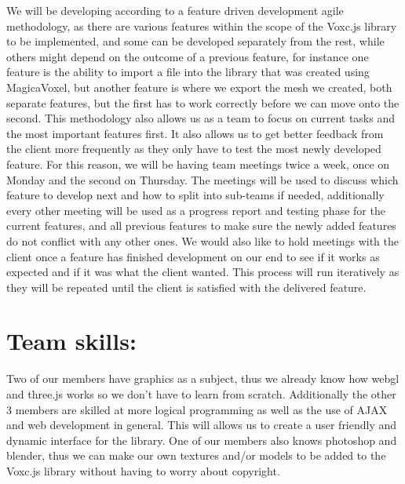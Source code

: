 \documentclass[english]{article}
\begin{document}
	We will be developing according to a feature driven development agile methodology, as there are various features within the scope of the Voxc.js library to be implemented, and some can be developed separately from the rest, while others might depend on the outcome of a previous feature, for instance one feature is the ability to import a file into the library that was created using MagicaVoxel, but another feature is where we export the mesh we created, both separate features, but the first has to work correctly before we can move onto the second.
		\newline
	\newline
	This methodology also allows us as a team to focus on current tasks and the most important features first. It also allows us to get better feedback from the client more frequently as they only have to test the most newly developed feature.
		\newline
	\newline
	For this reason, we will be having team meetings twice a week, once on Monday and the second on Thursday. The meetings will be used to discuss which feature to develop next and how to split into sub-teams if needed, additionally every other meeting will be used as a progress report and testing phase for the current features, and all previous features to make sure the newly added features do not conflict with any other ones. We would also like to hold meetings with the client once a feature has finished development on our end to see if it works as expected and if it was what the client wanted. This process will run iteratively as they will be repeated until the client is satisfied with the delivered feature.  
	\medskip
	\section{Team skills:}
	Two of our members have graphics as a subject, thus we already know how webgl and three.js works so we don't have to learn from scratch.
	\newline
	\newline
	Additionally the other 3 members are skilled at more logical programming as well as the use of AJAX and web development in general. This will allows us to create a user friendly and dynamic interface for the library.
	\newline
	\newline
	One of our members also knows photoshop and blender, thus we can make our own textures and/or models to be added to the Voxc.js library without having to worry about copyright.
	\medskip
	
\end{document}
